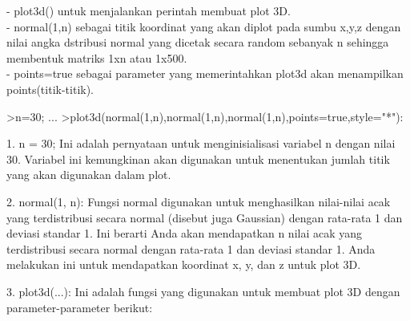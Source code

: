 \documentclass[a4paper,10pt]{article}
\begin{document}
\begin{eulernotebook}
\begin{eulercomment}
\begin{eulercomment}
\begin{eulercomment}
\begin{eulercomment}
\begin{eulercomment}
\begin{eulercomment}
\begin{eulercomment}
\begin{eulercomment}
\begin{eulercomment}
- plot3d() untuk menjalankan perintah membuat plot 3D.\\
- normal(1,n) sebagai titik koordinat yang akan diplot pada sumbu
x,y,z dengan nilai angka dstribusi normal yang dicetak secara random
sebanyak n sehingga membentuk matriks 1xn atau 1x500.\\
- points=true sebagai parameter yang memerintahkan plot3d akan
menampilkan points(titik-titik).

\end{eulercomment}
\begin{eulerprompt}
>n=30; ...
>plot3d(normal(1,n),normal(1,n),normal(1,n),points=true,style="*"):
\end{eulerprompt}
\begin{eulercomment}
1. n = 30; Ini adalah pernyataan untuk menginisialisasi variabel n
dengan nilai 30. Variabel ini kemungkinan akan digunakan untuk
menentukan jumlah titik yang akan digunakan dalam plot.

2. normal(1, n): Fungsi normal digunakan untuk menghasilkan
nilai-nilai acak yang terdistribusi secara normal (disebut juga
Gaussian) dengan rata-rata 1 dan deviasi standar 1. Ini berarti Anda
akan mendapatkan n nilai acak yang terdistribusi secara normal dengan
rata-rata 1 dan deviasi standar 1. Anda melakukan ini untuk
mendapatkan koordinat x, y, dan z untuk plot 3D.

3. plot3d(...): Ini adalah fungsi yang digunakan untuk membuat plot 3D
dengan parameter-parameter berikut:


\end{eulercomment}
\end{eulercomment}
\end{eulercomment}
\end{eulercomment}
\end{eulercomment}
\end{eulercomment}
\end{eulercomment}
\end{eulercomment}
\end{eulercomment}
\end{eulernotebook}
\end{document}
